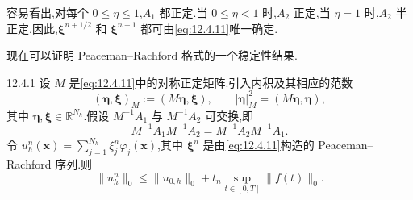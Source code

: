 容易看出,对每个 \(0\le\eta\le1\),\(A_1\) 都正定.当 \(0\le\eta<1\) 时,\(A_2\) 正定,当 \(\eta=1\) 时,\(A_2\) 半正定.因此,\(\boldsymbol{\xi}^{n+1/2}\) 和 \(\boldsymbol{\xi}^{n+1}\) 都可由\eqref{eq:12.4.11}唯一确定.

现在可以证明 Peaceman--Rachford 格式的一个稳定性结果.

\begin{proposition}[]{12.4.1}
设 \(M\) 是\eqref{eq:12.4.11}中的对称正定矩阵.引入内积及其相应的范数
\begin{equation}\label{eq:12.4.12}
  (\boldsymbol{\eta},\boldsymbol{\xi})_M:=(M\boldsymbol{\eta},\boldsymbol{\xi}),
  \qquad |\boldsymbol{\eta}|_M^2=(M\boldsymbol{\eta},\boldsymbol{\eta}),
\end{equation}
其中 \(\boldsymbol{\eta},\boldsymbol{\xi}\in\mathbb R^{N_h}\).假设 \(M^{-1}A_1\) 与 \(M^{-1}A_2\) 可交换,即
\begin{equation}\label{eq:12.4.13}
  M^{-1}A_1M^{-1}A_2=M^{-1}A_2M^{-1}A_1.
\end{equation}
令 \(u_h^n(\boldsymbol{x})=\sum_{j=1}^{N_h}\xi_j^n\varphi_j(\boldsymbol{x})\),其中 \(\boldsymbol{\xi}^n\) 是由\eqref{eq:12.4.11}构造的 Peaceman--Rachford 序列.则
\begin{equation}\label{eq:12.4.14}
  \|u_h^n\|_0\le\|u_{0,h}\|_0+t_n\sup_{t\in[0,T]}\|f(t)\|_0.
\end{equation}
\end{proposition}


